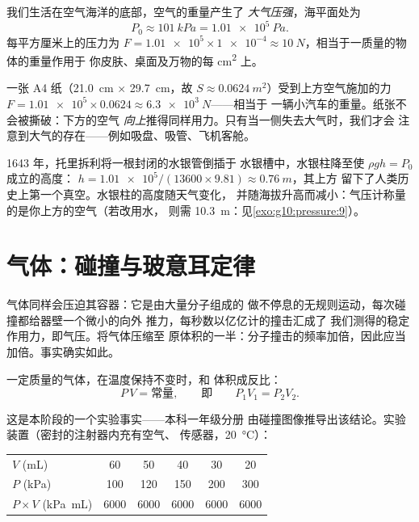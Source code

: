 \begin{definition}[大气压强]\label{def:g10:pressure:atmospheric}
我们生活在空气海洋的底部，空气的重量产生了
\emph{大气压强}，海平面处为
\[
P_0 \approx \qty{101}{kPa} = \qty{1.01e5}{Pa}.
\]
每平方厘米上的压力为 $F = \num{1.01e5} \times \num{1e-4}
\approx \qty{10}{N}$，相当于一质量的物体的重量作用于
你皮肤、桌面及万物的每 \unit{cm^2} 上。
\end{definition}

\begin{example}[看不见的负荷]\label{ex:g10:pressure:sheet}
一张 A4 纸（\qty{21.0}{cm} $\times$ \qty{29.7}{cm}，故
$S \approx \qty{0.0624}{m^2}$）受到上方空气施加的力
$F = \num{1.01e5} \times 0.0624 \approx \qty{6.3e3}{N}$——相当于
一辆小汽车的重量。纸张不会被撕破：下方的空气
\emph{向上}推得同样用力。只有当一侧失去大气时，我们才会
注意到大气的存在——例如吸盘、吸管、飞机客舱。
\end{example}

\begin{remark}[托里拆利气压计]\label{rem:g10:pressure:torricelli}
1643 年，托里拆利将一根封闭的水银管倒插于
水银槽中，水银柱降至使 $\rho g h = P_0$ 成立的高度：
$h = \num{1.01e5}/(13600 \times 9.81) \approx \qty{0.76}{m}$，其上方
留下了人类历史上第一个真空。水银柱的高度随天气变化，
并随海拔升高而减小：气压计称量的是你上方的空气（若改用水，
则需 \qty{10.3}{m}：见\cref{exo:g10:pressure:9}）。
\end{remark}

\section{气体：碰撞与玻意耳定律}

气体同样会压迫其容器：它是由大量分子组成的
做不停息的无规则运动，每次碰撞都给器壁一个微小的向外
推力，每秒数以亿亿计的撞击汇成了
我们测得的稳定作用力，即气压。将气体压缩至
原体积的一半：分子撞击的频率加倍，因此应当
加倍。事实确实如此。

\begin{proposition}[玻意耳定律]\label{prop:g10:pressure:boyle}
一定质量的气体，在温度保持不变时，和
体积成反比：
\[
P \, V = \text{常量},
\qquad\text{即}\qquad
P_1 V_1 = P_2 V_2 .
\]
\end{proposition}
\admitted

\begin{remark}
这是本阶段的一个实验事实——本科一年级分册
由碰撞图像推导出该结论。实验装置（密封的注射器内充有空气、
传感器，\qty{20}{\degreeCelsius}）：
\begin{center}
\begin{tabular}{lccccc}
$V$ (\unit{mL}) & 60 & 50 & 40 & 30 & 20 \\
$P$ (\unit{kPa}) & 100 & 120 & 150 & 200 & 300 \\
$P \times V$ (\unit{kPa.mL}) & 6000 & 6000 & 6000 & 6000 & 6000
\end{tabular}
\end{center}
\end{remark}

